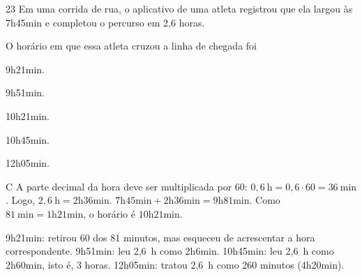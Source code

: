 \begin{questaoinedita}{2}{3}
Em uma corrida de rua, o aplicativo de uma atleta registrou que ela largou às 7h45min e completou
o percurso em 2,6 horas.

O horário em que essa atleta cruzou a linha de chegada foi
\begin{alternativas*}[5]
\item 9h21min.
\item 9h51min.
\item 10h21min.
\item 10h45min.
\item 12h05min.
\end{alternativas*}
\end{questaoinedita}
\begin{resolucao}{C}
 A parte decimal da hora deve ser multiplicada por 60:
$0,6~\text{h}=0,6\cdot 60=36~\text{min}$. Logo, $2,6~\text{h}=2\text{h}36\text{min}$.
$7\text{h}45\text{min}+2\text{h}36\text{min}=9\text{h}81\text{min}$. Como
$81~\text{min}=1\text{h}21\text{min}$, o horário é $10\text{h}21\text{min}$.
\begin{distratores}
 9h21min: retirou 60 dos 81 minutos, mas esqueceu de acrescentar a hora correspondente.
 9h51min: leu 2,6~h como 2h6min.
 10h45min: leu 2,6~h como 2h60min, isto é, 3 horas.
 12h05min: tratou 2,6~h como 260 minutos (4h20min).
\end{distratores}
\end{resolucao}

